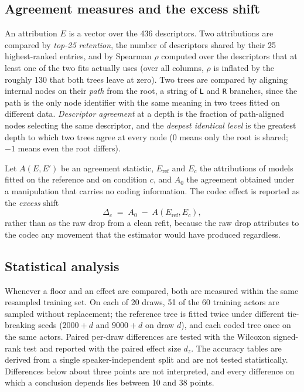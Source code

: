 \documentclass[lettersize,journal]{IEEEtran}
\newcommand{\ttf}[1]{\texttt{\footnotesize #1}}
\begin{document}
\subsection{Agreement measures and the excess shift}\label{sec:measures}
An attribution $E$ is a vector over the 436 descriptors. Two attributions are
compared by \emph{top-25 retention}, the number of descriptors shared by their
25 highest-ranked entries, and by Spearman $\rho$ computed over the descriptors
that at least one of the two fits actually uses (over all columns, $\rho$ is
inflated by the roughly 130 that both trees leave at zero). Two trees are
compared by aligning internal nodes on their \emph{path} from the root, a string
of \ttf{L} and \ttf{R} branches, since the path is the only node identifier
with the same meaning in two trees fitted on different data. \emph{Descriptor
agreement} at a depth is the fraction of path-aligned nodes selecting the same
descriptor, and the \emph{deepest identical level} is the greatest depth to
which two trees agree at every node (0 means only the root is shared; $-1$
means even the root differs).

Let $A(E,E')$ be an agreement statistic, $E_{\text{ref}}$ and $E_c$ the
attributions of models fitted on the reference and on condition $c$, and $A_0$
the agreement obtained under a manipulation that carries no coding
information. The codec effect is reported as the \emph{excess} shift
\begin{equation}\label{eq:excess}
\Delta_c \;=\; A_0 \;-\; A(E_{\text{ref}},E_c),
\end{equation}
rather than as the raw drop from a clean refit, because the raw drop attributes
to the codec any movement that the estimator would have produced regardless.

\subsection{Statistical analysis}
Whenever a floor and an effect are compared, both are measured within the same
resampled training set. On each of 20 draws, 51 of the 60 training actors are
sampled without replacement; the reference tree is fitted twice under different
tie-breaking seeds ($2000+d$ and $9000+d$ on draw $d$), and each coded tree once
on the same actors. Paired per-draw differences are tested with the Wilcoxon
signed-rank test and reported with the paired effect size $d_z$. The accuracy
tables are derived from a single speaker-independent split and are not tested
statistically. Differences below about three points are not interpreted, and
every difference on which a conclusion depends lies between 10 and 38 points.
\end{document}
